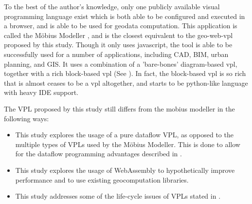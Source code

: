 To the best of the author's knowledge, only one publicly available visual programming language exist which is both able to be configured and executed in a browser, and is able to be used for geodata computation.
This application is called the Möbius Modeller \citep{janssen_mobius_2021}, and is the closest equivalent to the geo-web-vpl proposed by this study.
Though it only uses javascript, the tool is able to be successfully used for a number of applications, including CAD, BIM, urban planning, and GIS. 
It uses a combination of a 'bare-bones' diagram-based vpl, together with a rich block-based vpl (See ).
In fact, the block-based vpl is so rich that is almost ceases to be a vpl altogether, and starts to be python-like language with heavy IDE support.  

The VPL proposed by this study still differs from the mobius modeller in the following ways: 
\begin{itemize}[-]
  \item This study explores the usage of a pure dataflow VPL, as opposed to the multiple types of VPLs used by the Möbius Modeller. This is done to allow for the dataflow programming advantages described in .
  \item This study explores the usage of WebAssembly to hypothetically improve performance and to use existing geocomputation libraries.
  \item This study addresses some of the life-cycle issues of \ac{VPL}s stated in . 
\end{itemize}

